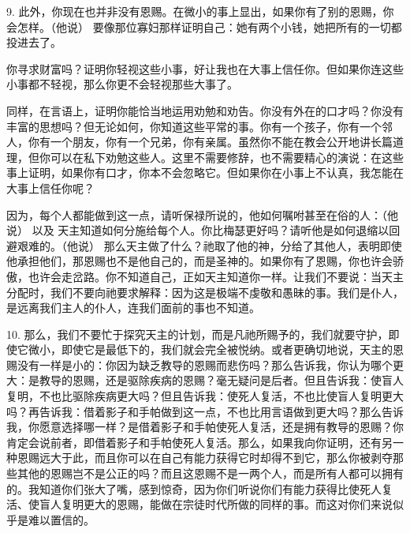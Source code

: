 9. 此外，你现在也并非没有恩赐。在微小的事上显出，如果你有了别的恩赐，你会怎样。（他说） 要像那位寡妇那样证明自己：她有两个小钱，她把所有的一切都投进去了。\par

你寻求财富吗？证明你轻视这些小事，好让我也在大事上信任你。但如果你连这些小事都不轻视，那么你更不会轻视那些大事了。\par

同样，在言语上，证明你能恰当地运用劝勉和劝告。你没有外在的口才吗？你没有丰富的思想吗？但无论如何，你知道这些平常的事。你有一个孩子，你有一个邻人，你有一个朋友，你有一个兄弟，你有亲属。虽然你不能在教会公开地讲长篇道理，但你可以在私下劝勉这些人。这里不需要修辞，也不需要精心的演说：在这些事上证明，如果你有口才，你本不会忽略它。但如果你在小事上不认真，我怎能在大事上信任你呢？\par

因为，每个人都能做到这一点，请听保禄所说的，他如何嘱咐甚至在俗的人：（他说） 以及 天主知道如何分施给每个人。你比梅瑟更好吗？请听他是如何退缩以回避艰难的。（他说） 那么天主做了什么？祂取了他的神，分给了其他人，表明即使他承担他们，那恩赐也不是他自己的，而是圣神的。如果你有了恩赐，你也许会骄傲，也许会走岔路。你不知道自己，正如天主知道你一样。让我们不要说：当天主分配时，我们不要向祂要求解释：因为这是极端不虔敬和愚昧的事。我们是仆人，是远离我们主人的仆人，连我们面前的事也不知道。\par

10. 那么，我们不要忙于探究天主的计划，而是凡祂所赐予的，我们就要守护，即使它微小，即使它是最低下的，我们就会完全被悦纳。或者更确切地说，天主的恩赐没有一样是小的：你因为缺乏教导的恩赐而悲伤吗？那么告诉我，你认为哪个更大：是教导的恩赐，还是驱除疾病的恩赐？毫无疑问是后者。但且告诉我：使盲人复明，不也比驱除疾病更大吗？但且告诉我：使死人复活，不也比使盲人复明更大吗？再告诉我：借着影子和手帕做到这一点，不也比用言语做到更大吗？那么告诉我，你愿意选择哪一样？是借着影子和手帕使死人复活，还是拥有教导的恩赐？你肯定会说前者，即借着影子和手帕使死人复活。那么，如果我向你证明，还有另一种恩赐远大于此，而且你可以在自己有能力获得它时却得不到它，那么你被剥夺那些其他的恩赐岂不是公正的吗？而且这恩赐不是一两个人，而是所有人都可以拥有的。我知道你们张大了嘴，感到惊奇，因为你们听说你们有能力获得比使死人复活、使盲人复明更大的恩赐，能做在宗徒时代所做的同样的事。而这对你们来说似乎是难以置信的。\par

